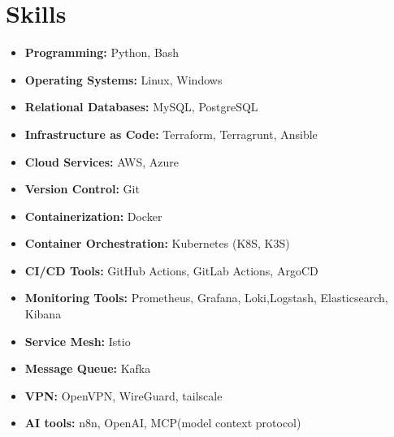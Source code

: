 \documentclass[a4paper,10pt]{article}
\begin{document}
\section*{Skills}
\begin{itemize}[leftmargin=0.5in]
    \item \textbf{Programming:} Python, Bash
    \item \textbf{Operating Systems:} Linux, Windows
    \item \textbf{Relational Databases:} MySQL, PostgreSQL
    \item \textbf{Infrastructure as Code:} Terraform, Terragrunt, Ansible
    \item \textbf{Cloud Services:} AWS, Azure
    \item \textbf{Version Control:} Git
    \item \textbf{Containerization:} Docker
    \item \textbf{Container Orchestration:} Kubernetes (K8S, K3S)
    \item \textbf{CI/CD Tools:} GitHub Actions, GitLab Actions, ArgoCD
    \item \textbf{Monitoring Tools:} Prometheus, Grafana, Loki,Logstash, Elasticsearch, Kibana
    \item \textbf{Service Mesh:} Istio
    \item \textbf{Message Queue:} Kafka
    \item \textbf{VPN:} OpenVPN, WireGuard, tailscale
    \item \textbf{AI tools:} n8n, OpenAI, MCP(model context protocol)
\end{itemize}

\vspace{10pt}
\end{document}
